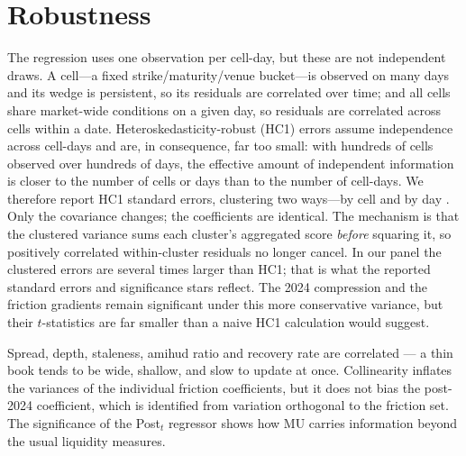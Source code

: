 \documentclass[12pt]{article}
\providecommand{\RegSEdesc}{HC1}%
\begin{document}
\clearpage
\section{Robustness}
\label{sec:robustness}

The regression uses one observation per cell-day, but these are not independent draws. A cell---a fixed strike/maturity/venue bucket---is observed on many days and its wedge is persistent, so its residuals are correlated over time; and all cells share market-wide conditions on a given day, so residuals are correlated across cells within a date. Heteroskedasticity-robust (HC1) errors assume independence across cell-days and are, in consequence, far too small: with hundreds of cells observed over hundreds of days, the effective amount of independent information is closer to the number of cells or days than to the number of cell-days. We therefore report \RegSEdesc{} standard errors, clustering two ways---by cell and by day \citep{cameron2011robust}. Only the covariance changes; the coefficients are identical. The mechanism is that the clustered variance sums each cluster's aggregated score \emph{before} squaring it, so positively correlated within-cluster residuals no longer cancel. In our panel the clustered errors are several times larger than HC1; that is what the reported standard errors and significance stars reflect. The 2024 compression and the friction gradients remain significant under this more conservative variance, but their $t$-statistics are far smaller than a naive HC1 calculation would suggest.

Spread, depth, staleness, amihud ratio and recovery rate are correlated --- a thin book tends to be wide, shallow, and slow to update at once. Collinearity inflates the variances of the individual friction coefficients, but it does not bias the post-2024 coefficient, which is identified from variation orthogonal to the friction set. The significance of the Post$_t$ regressor shows how MU carries information beyond the usual liquidity measures. 
\end{document}

